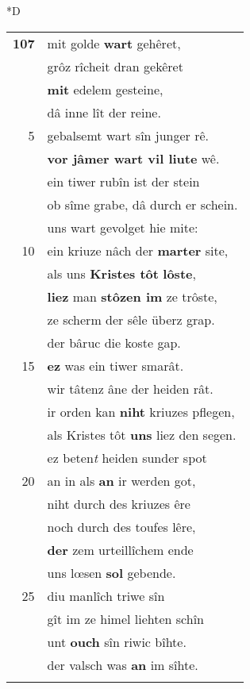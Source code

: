 \documentclass[8pt,a4paper,notitlepage]{article}
\begin{document}
\begin{table}[ht]
\begin{minipage}[t]{0.5\linewidth}
\small
\begin{center}*D
\end{center}
\begin{tabular}{rl}
\textbf{107} & mit golde \textbf{wart} gehêret,\\ 
 & grôz rîcheit dran gekêret\\ 
 & \textbf{mit} edelem gesteine,\\ 
 & dâ inne lît der reine.\\ 
5 & gebalsemt wart sîn junger rê.\\ 
 & \textbf{vor jâmer wart vil liute} wê.\\ 
 & ein tiwer rubîn ist der stein\\ 
 & ob sîme grabe, dâ durch er schein.\\ 
 & uns wart gevolget hie mite:\\ 
10 & ein kriuze nâch der \textbf{marter} site,\\ 
 & als uns \textbf{Kristes tôt} \textbf{lôste},\\ 
 & \textbf{liez} man \textbf{stôzen im} ze trôste,\\ 
 & ze scherm der sêle überz grap.\\ 
 & der bâruc die koste gap.\\ 
15 & \textbf{ez} was ein tiwer smarât.\\ 
 & wir tâtenz âne der heiden rât.\\ 
 & ir orden kan \textbf{niht} kriuzes pflegen,\\ 
 & als Kristes tôt \textbf{uns} liez den segen.\\ 
 & ez beten\textit{t} heiden sunder spot\\ 
20 & an in als \textbf{an} ir werden got,\\ 
 & niht durch des kriuzes êre\\ 
 & noch durch des toufes lêre,\\ 
 & \textbf{der} zem urteillîchem ende\\ 
 & uns lœsen \textbf{sol} gebende.\\ 
25 & diu manlîch triwe sîn\\ 
 & gît im ze himel liehten schîn\\ 
 & unt \textbf{ouch} sîn riwic bîhte.\\ 
 & der valsch was \textbf{an} im sîhte.\\ 
 & \textit{\begin{large}I\end{large}}n \textbf{sînen} helm, \textbf{den} adamas,\\ 

\end{tabular}
\end{minipage}
\end{table}
\end{document}
